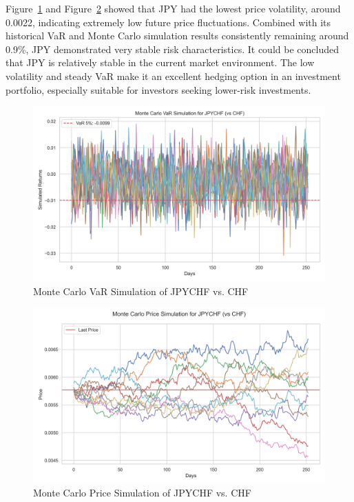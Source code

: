 \documentclass{article}
\begin{document}
Figure~\ref{fig:monte_carlo_var_simulation_JPYCHF_vs_CHF} and Figure~\ref{fig:monte_carlo_price_simulation_JPYCHF_vs_CHF} showed that JPY had the lowest price volatility, around 0.0022, indicating extremely low future price fluctuations. Combined with its historical VaR and Monte Carlo simulation results consistently remaining around 0.9\%, JPY demonstrated very stable risk characteristics. It could be concluded that JPY is relatively stable in the current market environment. The low volatility and steady VaR make it an excellent hedging option in an investment portfolio, especially suitable for investors seeking lower-risk investments.

\begin{figure}[H]
    \centering  \includegraphics[width=0.75\linewidth]{../../reports/figures/monte_carlo_var_simulation_JPYCHF_vs_CHF.png}
    \caption{Monte Carlo VaR Simulation of JPYCHF vs. CHF}   \label{fig:monte_carlo_var_simulation_JPYCHF_vs_CHF}
\end{figure}

\begin{figure}[H]
    \centering
    \includegraphics[width=0.75\linewidth]{../../reports/figures/monte_carlo_price_simulation_JPYCHF_vs_CHF.png}
    \caption{Monte Carlo Price Simulation of JPYCHF vs. CHF}  \label{fig:monte_carlo_price_simulation_JPYCHF_vs_CHF}
\end{figure}
\end{document}

